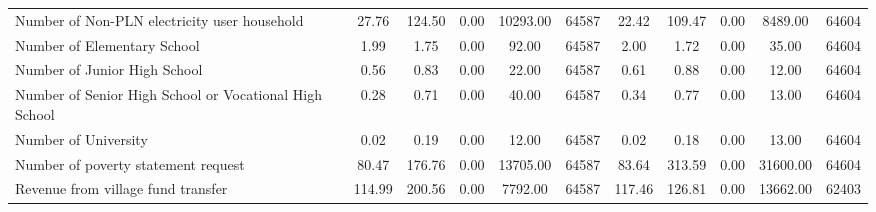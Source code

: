 \begin{tabular}{l*{2}{ccccc}}
Number of Non-PLN electricity user household&    27.76&   124.50&     0.00& 10293.00&    64587&    22.42&   109.47&     0.00&  8489.00&    64604\\
Number of Elementary School&     1.99&     1.75&     0.00&    92.00&    64587&     2.00&     1.72&     0.00&    35.00&    64604\\
Number of Junior High School&     0.56&     0.83&     0.00&    22.00&    64587&     0.61&     0.88&     0.00&    12.00&    64604\\
Number of Senior High School or Vocational High School&     0.28&     0.71&     0.00&    40.00&    64587&     0.34&     0.77&     0.00&    13.00&    64604\\
Number of University&     0.02&     0.19&     0.00&    12.00&    64587&     0.02&     0.18&     0.00&    13.00&    64604\\
Number of poverty statement request&    80.47&   176.76&     0.00& 13705.00&    64587&    83.64&   313.59&     0.00& 31600.00&    64604\\
Revenue from village fund transfer&   114.99&   200.56&     0.00&  7792.00&    64587&   117.46&   126.81&     0.00& 13662.00&    62403\\
\bottomrule
\end{tabular}
